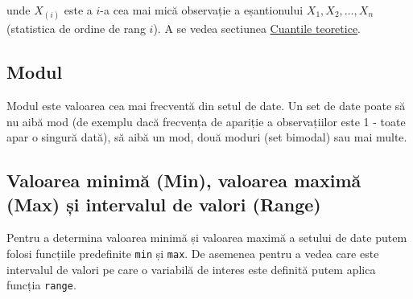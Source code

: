 \documentclass[]{article}
\newenvironment{Shaded}{\begin{snugshade}}{\end{snugshade}}
\newcommand{\KeywordTok}[1]{\textcolor[rgb]{0.13,0.29,0.53}{\textbf{#1}}}
\newcommand{\DecValTok}[1]{\textcolor[rgb]{0.00,0.00,0.81}{#1}}
\newcommand{\StringTok}[1]{\textcolor[rgb]{0.31,0.60,0.02}{#1}}
\newcommand{\OperatorTok}[1]{\textcolor[rgb]{0.81,0.36,0.00}{\textbf{#1}}}
\newcommand{\NormalTok}[1]{#1}
\begin{document}
unde \(X_{(i)}\) este a \(i\)-a cea mai mică observație a eșantionului
\(X_1, X_2, \ldots, X_n\) (statistica de ordine de rang \(i\)). A se
vedea sectiunea \protect\hyperlink{sec:cuantile}{Cuantile teoretice}.

\begin{Shaded}
\end{Shaded}

\subsection{Modul}\label{modul}

Modul este valoarea cea mai frecventă din setul de date. Un set de date
poate să nu aibă mod (de exemplu dacă frecvența de apariție a
observațiilor este 1 - toate apar o singură dată), să aibă un mod, două
moduri (set bimodal) sau mai multe.

\begin{Shaded}
\end{Shaded}

\subsection{Valoarea minimă (Min), valoarea maximă (Max) și intervalul
de valori
(Range)}\label{valoarea-minima-min-valoarea-maxima-max-si-intervalul-de-valori-range}

Pentru a determina valoarea minimă și valoarea maximă a setului de date
putem folosi funcțiile predefinite \texttt{min} și \texttt{max}. De
asemenea pentru a vedea care este intervalul de valori pe care o
variabilă de interes este definită putem aplica funcția \texttt{range}.
\end{document}
